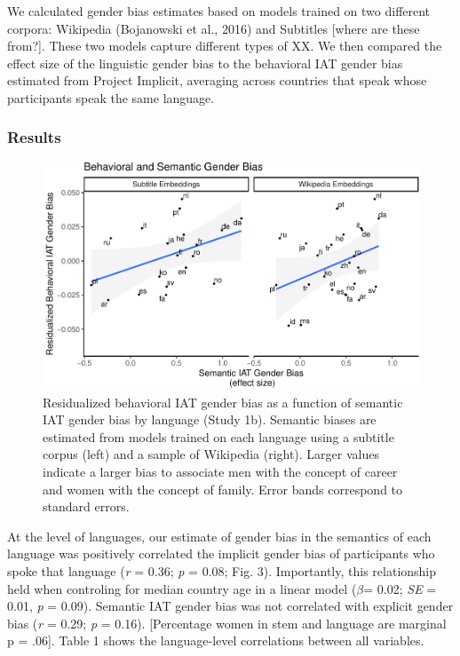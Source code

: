 \documentclass[man,floatsintext]{apa6}
\theoremstyle{definition}
\theoremstyle{definition}
\theoremstyle{definition}
\theoremstyle{remark}
\begin{document}
We calculated gender bias estimates based on models trained on two
different corpora: Wikipedia (Bojanowski et al., 2016) and Subtitles
{[}where are these from?{]}. These two models capture different types of
XX. We then compared the effect size of the linguistic gender bias to
the behavioral IAT gender bias estimated from Project Implicit,
averaging across countries that speak whose participants speak the same
language.

\subsubsection{Results}\label{results}

\begin{figure}
\centering
\includegraphics{iat_lang_files/figure-latex/unnamed-chunk-14-1.pdf}
\caption{\label{fig:unnamed-chunk-14}Residualized behavioral IAT gender bias
as a function of semantic IAT gender bias by language (Study 1b).
Semantic biases are estimated from models trained on each language using
a subtitle corpus (left) and a sample of Wikipedia (right). Larger
values indicate a larger bias to associate men with the concept of
career and women with the concept of family. Error bands correspond to
standard errors.}
\end{figure}

At the level of languages, our estimate of gender bias in the semantics
of each language was positively correlated the implicit gender bias of
participants who spoke that language (\emph{r} = 0.36; \emph{p} = 0.08;
Fig. 3). Importantly, this relationship held when controling for median
country age in a linear model (\(\beta\)= 0.02; \emph{SE} = 0.01,
\emph{p} = 0.09). Semantic IAT gender bias was not correlated with
explicit gender bias (\emph{r} = 0.29; \emph{p} = 0.16). {[}Percentage
women in stem and language are marginal p = .06{]}. Table 1 shows the
language-level correlations between all variables.
\end{document}
